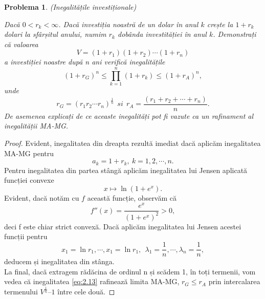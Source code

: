 \documentclass[a4paper,12pt,oneside]{report}
\newtheorem{problem}{Problema}
\begin{document}
\begin{problem} (Inegalitățile investiționale)

Dacă \(0< r_{k} < \infty\). Dacă investiția noastră de un dolar în anul \(k\) crește la \(1 +  r_{k}\) dolari la sfârșitul anului, numim \(r_{k}\) dobânda investităției în anul \(k\). Demonstrați că valoarea
\begin{displaymath}
  V = \left ( 1 + r_{1} \right )\left ( 1 + r_{2} \right )\cdots \left ( 1 + r_{n} \right )
\end{displaymath}
a investiției noastre după n ani verifică inegalitățile
\begin{displaymath}
  \left ( 1 + r_{G} \right )^{n} \leq \prod_{k = 1}^{n} \left ( 1 + r_{k} \right )\leq \left ( 1 + r_{A} \right )^{n}, \label{eq:2.13} \tag{2.13}
\end{displaymath}
unde
\begin{displaymath}
  r_{G} = \left ( r_{1}r_{2} \cdots r_{n}\right )^{\frac{1}{n}}~~ si~~ r_{A} = \frac{\left ( r_{1} + r_{2} +  \cdots+ r_{n}\right )}{n}.
\end{displaymath}
De asemenea explicați de ce aceaste inegalități  pot fi vazute ca un rafinament al inegalității MA-MG.
\end{problem}
\begin{proof}
Evident, inegalitatea din dreapta rezultă imediat dacă aplicăm inegalitatea MA-MG pentru
\begin{displaymath}
  a_{k} = 1 + r_{k},~ k =1,2,\cdots, n.
\end{displaymath}
Pentru inegalitatea din partea stângă aplicăm inegalitatea lui Jensen aplicată funcției convexe
\[x \mapsto \ln\left ( 1 + e^{x} \right ).\]
Evident, dacă notăm cu $f$ această funcție, observăm că
\[
f''(x)=\frac{e^x}{(1+e^x)^2}>0,
\]
deci f este chiar strict convexă. Dacă aplicăm inegalitatea lui Jensen acestei funcții pentru
\[
x_1=\ln r_1,\cdots, x_1=\ln r_1,~~\lambda_1=\frac{1}{n},\cdots, \lambda_n=\frac{1}{n},
\]
deducem și inegalitatea din stânga.\\
La final, dacă extragem rădăcina de ordinul n și scădem 1, în toți termenii, vom vedea că inegalitatea \ref{eq:2.13} rafinează limita MA-MG,  \(r_{G} \leq r_{A}\) prin intercalarea termenului \(V^{\frac{1}{n}} – 1\) între cele două.
\end{proof}
\end{document}

